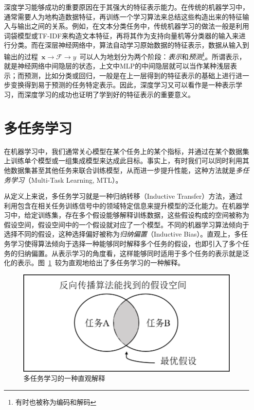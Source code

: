 深度学习能够成功的重要原因在于其强大的特征表示能力。在传统的机器学习中，通常需要人为地构造数据特征，再训练一个学习算法来总结这些构造出来的特征输入与输出之间的关系。例如，在文本分类任务中，传统机器学习的做法一般是利用词袋模型或TF-IDF来构造文本特征，再将其作为支持向量机等分类器的输入来进行分类。而在深层神经网络中，算法自动学习原始数据的特征表示，数据从输入到输出的过程~$\mathbf{x}\to \mathcal{F} \to y$~可以人为地划分为两个阶段：\emph{表示}和\emph{预测}\footnote{有时也被称为编码和解码}。所谓表示，就是神经网络中间隐层的状态，上文中MLP的中间隐层就可以当作某种浅层表示；而预测，比如分类或回归，一般是在上一层得到的特征表示的基础上进行进一步变换得到易于预测的任务特定表示。因此，深度学习又可以看作是一种表示学习，而深度学习的成功也证明了学到好的特征表示的重要意义。

\section{多任务学习}
\label{sec:mtl}
在机器学习中，我们通常关心模型在某个任务上的某个指标，并通过在某个数据集上训练单个模型或一组集成模型来达成此目标。事实上，有时我们可以同时利用其他数据集甚至其他任务来联合训练模型，从而进一步提升性能，这种方法就是\emph{多任务学习}（Multi-Task Learning, MTL）。

从定义上来说，多任务学习就是一种归纳转移（Inductive Transfer）方法，通过利用包含在相关任务训练信号中的领域特定信息来提升模型的泛化能力\cite{Caruana1997}。在机器学习中，给定训练集，存在多个假设能够解释训练数据，这些假设构成的空间被称为假设空间，假设空间中的一个假设就对应了一个模型。不同的机器学习算法倾向于选择不同的假设，这种选择偏好被称为\emph{归纳偏置}（Inductive Bias）。直观上，多任务学习使得算法倾向于选择一种能够同时解释多个任务的假设，也即引入了多个任务的归纳偏置。从表示学习的角度看，这样能够同时适用于多个任务的表示就是泛化的表示。图~\ref{fig:mtl_int}~较为直观地给出了多任务学习的一种解释。

\begin{figure}[htb]
	\centering
	\includegraphics[scale=0.55]{mtl_int.png}
	\caption{多任务学习的一种直观解释}
	\label{fig:mtl_int}
\end{figure}

